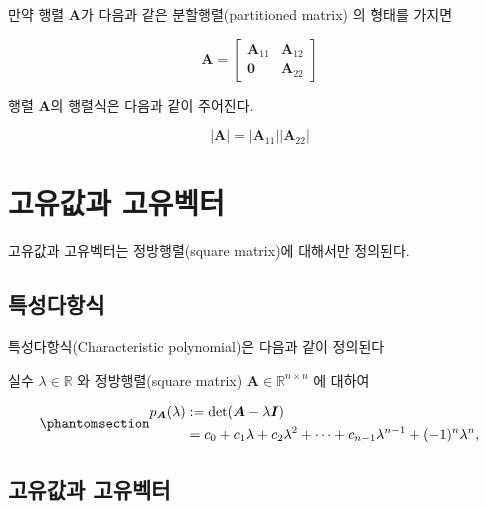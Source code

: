 \documentclass[
  11pt,
  a4paper,
  oneside]{scrbook}
\theoremstyle{definition}
\theoremstyle{plain}
\theoremstyle{definition}
\theoremstyle{definition}
\theoremstyle{remark}
\begin{document}
만약 행렬 \(\pmb A\)가 다음과 같은 분할행렬(partitioned matrix) 의
형태를 가지면

\[ 
\pmb A =
\begin{bmatrix}
{\pmb A}_{11} & {\pmb A}_{12} \\
{\pmb 0} & {\pmb A}_{22}
\end{bmatrix}
\]

행렬 \(\pmb A\)의 행렬식은 다음과 같이 주어진다.

\[ |{\pmb A}| = |{\pmb A}_{11}| |{\pmb A}_{22} | \]

\chapter{고유값과 고유벡터}\label{eigen-01}

\begin{tcolorbox}[enhanced jigsaw, colback=white, title=\textcolor{quarto-callout-caution-color}{\faFire}\hspace{0.5em}{주의}, colbacktitle=quarto-callout-caution-color!10!white, toprule=.15mm, breakable, bottomtitle=1mm, left=2mm, colframe=quarto-callout-caution-color-frame, leftrule=.75mm, coltitle=black, toptitle=1mm, titlerule=0mm, arc=.35mm, opacityback=0, opacitybacktitle=0.6, rightrule=.15mm, bottomrule=.15mm]

고유값과 고유벡터는 정방행렬(square matrix)에 대해서만 정의된다.

\end{tcolorbox}

\section{특성다항식}\label{uxd2b9uxc131uxb2e4uxd56duxc2dd}

특성다항식(Characteristic polynomial)은 다음과 같이 정의된다

실수 \(\lambda \in \mathbb{R}\) 와 정방행렬(square matrix)
\(\boldsymbol{A} \in \mathbb{R}^{n \times n}\) 에 대하여

\begin{equation}\phantomsection\label{eq-char-poly}{
\begin{aligned}
p_{\boldsymbol{A}}(\lambda) & :=\operatorname{det}(\boldsymbol{A}-\lambda \boldsymbol{I}) \\
& =c_0+c_1 \lambda+c_2 \lambda^2+\cdots+c_{n-1} \lambda^{n-1}+(-1)^n \lambda^n,
\end{aligned}
}\end{equation}

\section{고유값과
고유벡터}\label{uxace0uxc720uxac12uxacfc-uxace0uxc720uxbca1uxd130}
\end{document}
